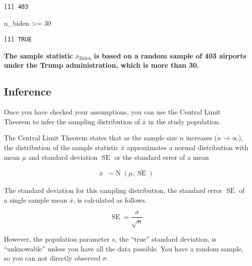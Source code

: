 \documentclass[
  letterpaper,
  DIV=11,
  numbers=noendperiod]{scrartcl}
\newenvironment{Shaded}{\begin{snugshade}}{\end{snugshade}}
\newcommand{\DecValTok}[1]{\textcolor[rgb]{0.68,0.00,0.00}{#1}}
\newcommand{\NormalTok}[1]{\textcolor[rgb]{0.00,0.23,0.31}{#1}}
\newcommand{\SpecialCharTok}[1]{\textcolor[rgb]{0.37,0.37,0.37}{#1}}
\begin{document}
\begin{verbatim}
[1] 403
\end{verbatim}

\begin{Shaded}
\begin{Highlighting}[]
\NormalTok{n\_biden }\SpecialCharTok{\textgreater{}=} \DecValTok{30}
\end{Highlighting}
\end{Shaded}

\begin{verbatim}
[1] TRUE
\end{verbatim}

\begin{tcolorbox}[enhanced jigsaw, colback=white, breakable, arc=.35mm, left=2mm, colframe=quarto-callout-warning-color-frame, opacityback=0, rightrule=.15mm, toprule=.15mm, bottomrule=.15mm, leftrule=.75mm]

\textbf{The sample statistic} \(\bar{x}_{\text{Biden}}\) \textbf{is
based on a random sample of 403 airports under the Trump administration,
which is more than 30.}

\end{tcolorbox}

\subsection{Inference}\label{inference-1}

Once you have checked your assumptions, you can use the Central Limit
Theorem to infer the sampling distribution of \(\bar{x}\) in the study
population.

The Central Limit Theorem states that as the sample size \(n\) increases
(\(n \to \infty\)), the distribution of the sample statistic \(\bar{x}\)
approximates a normal distribution with mean \(\mu\) and standard
deviation \(\operatorname{SE}\) or the standard error of a mean

\[
\begin{aligned}
\bar{x} &\sim \operatorname{N}\left(\mu, \operatorname{SE}\right)
\end{aligned}
\]

The standard deviation for this sampling distribution, the standard
error \(\operatorname{SE}\) of a single sample mean \(\bar{x}\), is
calculated as follows.

\[
\operatorname{SE}=\frac{\sigma}{\sqrt{n}}
\]

However, the population parameter \(s\), the ``true'' standard
deviation, is ``unknowable'' unless you have all the data possible. You
have a random sample, so you can not directly observed \(\sigma\).
\end{document}
